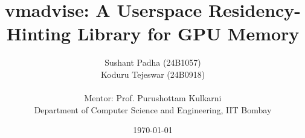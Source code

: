 \documentclass[11pt]{article}
\title{vmadvise: A Userspace Residency-Hinting Library for GPU Memory}
\author{
  Sushant Padha (24B1057) \\ Koduru Tejeswar (24B0918) \\
  \\
  \small Mentor: Prof. Purushottam Kulkarni \\
  \small Department of Computer Science and Engineering, IIT Bombay
}
\date{\today}
\begin{document}
\maketitle

\begin{abstract}
\end{abstract}










\end{document}
